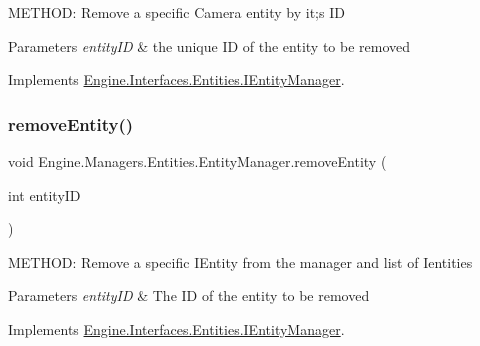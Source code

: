 M\+E\+T\+H\+OD\+: Remove a specific Camera entity by it;s ID 


\begin{DoxyParams}{Parameters}
{\em entity\+ID} & the unique ID of the entity to be removed\\
\hline
\end{DoxyParams}


Implements \hyperlink{a00442_aa341696fc31e28c71448cef613bf7f30}{Engine.\+Interfaces.\+Entities.\+I\+Entity\+Manager}.

\mbox{\label{a00518_a1d9ffc3b80cc8633265fe1f7e51c6122}} 
\subsubsection{\texorpdfstring{remove\+Entity()}{removeEntity()}}
{\footnotesize\ttfamily void Engine.\+Managers.\+Entities.\+Entity\+Manager.\+remove\+Entity (\begin{DoxyParamCaption}\item[{int}]{entity\+ID }\end{DoxyParamCaption})\hspace{0.3cm}{\ttfamily [inline]}}



M\+E\+T\+H\+OD\+: Remove a specific I\+Entity from the manager and list of Ientities 


\begin{DoxyParams}{Parameters}
{\em entity\+ID} & The ID of the entity to be removed\\
\hline
\end{DoxyParams}


Implements \hyperlink{a00442_a13b425137cec67f2df4e65e8d08c531b}{Engine.\+Interfaces.\+Entities.\+I\+Entity\+Manager}.

\mbox{\label{a00518_a960c2ec6b45bbbd4f0030b04f90dc407}} 
